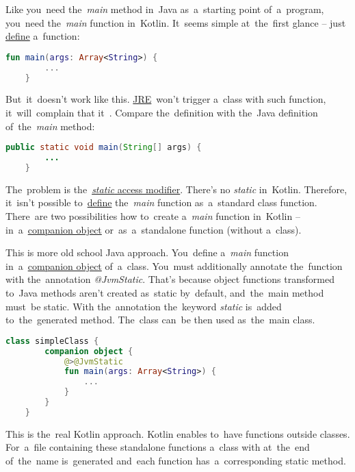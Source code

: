 Like you~need the~\textit{main} method in~Java as~a~starting point of~a~program, you~need the~\textit{main} function in~Kotlin.
It~seems simple at~the~first glance -- just \hyperref[declarationdefinition]{define} a~function:
\begin{lstlisting}[language=Kotlin]
    fun main(args: Array<String>) {
        ...
    }
\end{lstlisting}

\noindent But~it~doesn't work like this.
\hyperref[jdkjrejvm]{JRE}~won't trigger a~class with such function, it~will~complain that it~.
Compare the~definition with the~Java definition of~the~\textit{main} method:
\begin{lstlisting}[language=Java]
    public static void main(String[] args) {
        ...
    }
\end{lstlisting}

\noindent The~problem is the~\hyperref[javastatic]{\textit{static} access modifier}.
There's no \textit{static} in~Kotlin.
Therefore, it~isn't possible to~\hyperref[declarationdefinition]{define} the~\textit{main} function as~a~standard class function.
There~are two possibilities how to~create a~\textit{main} function in~Kotlin -- in~a~\hyperref[kotlincompanionobject]{companion object} or~as~a~standalone function (without a~class).

This is more old school Java approach.
You~define a~\textit{main} function in~a~\hyperref[kotlincompanionobject]{companion object} of~a~class.
You~must additionally annotate the~function with the~annotation \textit{@JvmStatic}.
That's because object functions transformed to~Java methods aren't created as~static by~default, and~the~main method must~be static.
With the~annotation the~keyword \textit{static} is~added to~the~generated method.
The~class can~be then used as~the~main class.

\begin{lstlisting}[language=Kotlin,title={Main function in~a~companion object}]
    class simpleClass {
        companion object {
            @>@JvmStatic
            fun main(args: Array<String>) {
                ...
            }
        }
    }
\end{lstlisting}

This is the~real Kotlin approach.
Kotlin enables to~have functions outside classes.
For~a~file containing these standalone functions a~class with  at~the~end of~the~name is~generated and~each function has~a~corresponding static method.

